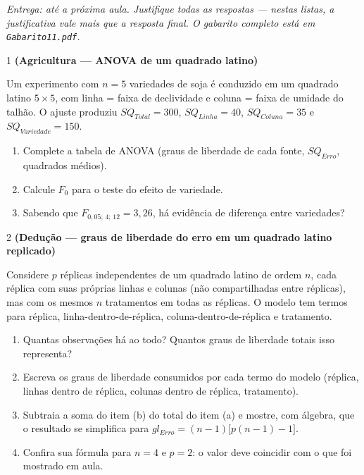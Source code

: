\documentclass[11pt]{article}
\begin{document}

\noindent \textit{Entrega: até a próxima aula. Justifique todas as respostas — nestas listas, a
justificativa vale mais que a resposta final. O gabarito completo está em \texttt{Gabarito11.pdf}.}

\begin{questao}{1} \textbf{(Agricultura --- ANOVA de um quadrado latino)}

Um experimento com $n=5$ variedades de soja é conduzido em um quadrado latino $5\times5$, com
linha = faixa de declividade e coluna = faixa de umidade do talhão. O ajuste produziu
$SQ_{Total}=300$, $SQ_{Linha}=40$, $SQ_{Coluna}=35$ e $SQ_{Variedade}=150$.

\begin{enumerate}[label=(\alph*)]
  \item Complete a tabela de ANOVA (graus de liberdade de cada fonte, $SQ_{Erro}$, quadrados
    médios).
  \item Calcule $F_0$ para o teste do efeito de variedade.
  \item Sabendo que $F_{0{,}05;\,4;\,12}=3{,}26$, há evidência de diferença entre variedades?
\end{enumerate}
\end{questao}

\begin{questao}{2} \textbf{(Dedução --- graus de liberdade do erro em um quadrado latino replicado)}

Considere $p$ réplicas independentes de um quadrado latino de ordem $n$, cada réplica com suas
próprias linhas e colunas (não compartilhadas entre réplicas), mas com os mesmos $n$
tratamentos em todas as réplicas. O modelo tem termos para réplica, linha-dentro-de-réplica,
coluna-dentro-de-réplica e tratamento.

\begin{enumerate}[label=(\alph*)]
  \item Quantas observações há ao todo? Quantos graus de liberdade totais isso representa?
  \item Escreva os graus de liberdade consumidos por cada termo do modelo (réplica, linhas dentro
    de réplica, colunas dentro de réplica, tratamento).
  \item Subtraia a soma do item (b) do total do item (a) e mostre, com álgebra, que o resultado
    se simplifica para $gl_{Erro} = (n-1)\big[p(n-1)-1\big]$.
  \item Confira sua fórmula para $n=4$ e $p=2$: o valor deve coincidir com o que foi mostrado em
    aula.
\end{enumerate}
\end{questao}
\end{document}
